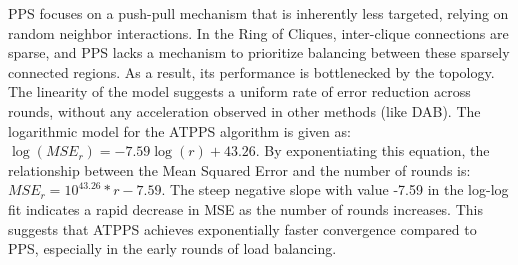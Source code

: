 PPS focuses on a push-pull mechanism that is inherently less targeted, relying on random neighbor interactions.
In the Ring of Cliques, inter-clique connections are sparse, and PPS lacks a mechanism to prioritize balancing between these sparsely connected regions. As a result, its performance is bottlenecked by the topology. The linearity of the model suggests a uniform rate of error reduction across rounds, without any acceleration observed in other methods (like DAB). The logarithmic model for the ATPPS algorithm is given as:
$\log{(MSE_r)}=-7.59\log{(r)}+43.26$. By exponentiating this equation, the relationship between the Mean Squared Error and the number of rounds is: $MSE_r=10^{43.26}*r-7.59$. The steep negative slope with value -7.59 in the log-log fit indicates a rapid decrease in MSE as the number of rounds increases. This suggests that ATPPS achieves exponentially faster convergence compared to PPS, especially in the early rounds of load balancing.



